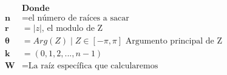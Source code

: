 


\begin{align}
    & \textbf{Donde} \nonumber \\
    \pmb{n}&= \text{el número de raíces a sacar} \nonumber \\
    \pmb{r}&= |z| \text{, el modulo de Z} \nonumber \\
    \pmb{\theta}&= Arg(Z) \mid Z \in [-\pi, \pi] \text{ Argumento principal de Z} \nonumber \\
    \pmb{k}&= (0, 1, 2, ..., n-1) \nonumber \\
    \pmb{W}&= \text{La raíz específica que calcularemos} \nonumber
\end{align}